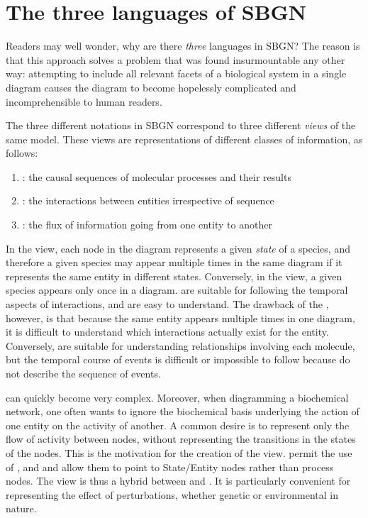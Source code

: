 \section{The three languages of SBGN}
\label{sec:languages}

Readers may well wonder, why are there \emph{three} languages in SBGN?  The reason is that this approach solves a problem that was found insurmountable any other way: attempting to include all relevant facets of a biological system in a single diagram causes the diagram to become hopelessly complicated and incomprehensible to human readers.

The three different notations in SBGN correspond to three different \emph{views} of the same model.  These views are representations of different classes of information, as follows:

\begin{enumerate}\setlength{\parskip}{0ex}

\item \emph{\PD{}}: the causal sequences of molecular processes and their
  results

\item \emph{\ER{}}: the interactions between entities irrespective of
sequence

\item \emph{\AF{}}: the flux of information going from one entity to
another

\end{enumerate}

In the \PD{} view, each node in the diagram represents a given \emph{state} of a species, and therefore a given species may appear multiple times in the same diagram if it represents the same entity in different states.  Conversely, in the \ER{} view, a given species appears only once in a diagram.  \PDs{} are suitable for following the temporal aspects of interactions, and are easy to understand.  The drawback of the \PD{}, however, is that because the same entity appears multiple times in one diagram, it is difficult to understand which interactions actually exist for the entity.  Conversely, \ERs{} are suitable for understanding relationships involving each molecule, but the temporal course of events is difficult or impossible to follow because \ERs do not describe the sequence of events.

\PDs{} can quickly become very complex.  Moreover, when diagramming a biochemical network, one often wants to ignore the biochemical basis underlying the action of one entity on the activity of another.  A common desire is to represent only the flow of activity between nodes, without representing the transitions in the states of the nodes.  This is the motivation for the creation of the \AF view.  \AFs permit the use of ,  and  and allow them to point to State/Entity nodes rather than process nodes.  The \AF view is thus a hybrid between \PD and \ERs.  It is particularly convenient for representing the effect of perturbations, whether genetic or environmental in nature.

